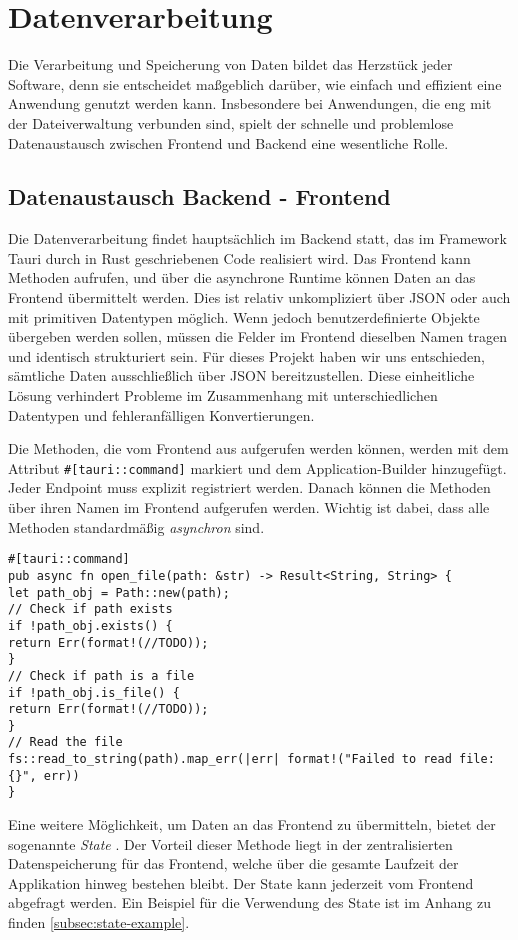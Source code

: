 \section{Datenverarbeitung}

Die Verarbeitung und Speicherung von Daten bildet das Herzstück jeder Software, denn sie entscheidet
maßgeblich darüber, wie einfach und effizient eine Anwendung genutzt werden kann. Insbesondere bei
Anwendungen, die eng mit der Dateiverwaltung verbunden sind, spielt der schnelle und problemlose
Datenaustausch zwischen Frontend und Backend eine wesentliche Rolle.


\subsection{Datenaustausch Backend - Frontend}
Die Datenverarbeitung findet hauptsächlich im Backend statt, das im Framework Tauri \cite{tauri2025} durch in Rust geschriebenen
Code realisiert wird. Das Frontend kann Methoden aufrufen, und über die asynchrone Runtime können Daten an das Frontend
übermittelt werden. Dies ist relativ unkompliziert über JSON oder auch mit primitiven Datentypen möglich. Wenn jedoch
benutzerdefinierte Objekte übergeben werden sollen, müssen die Felder im Frontend dieselben Namen tragen und identisch
strukturiert sein. Für dieses Projekt haben wir uns entschieden, sämtliche Daten ausschließlich über JSON bereitzustellen. Diese
einheitliche Lösung verhindert Probleme im Zusammenhang mit unterschiedlichen Datentypen und fehleranfälligen Konvertierungen.

Die Methoden, die vom Frontend aus aufgerufen werden können, werden mit dem Attribut \verb|#[tauri::command]| markiert und dem
Application-Builder hinzugefügt. Jeder Endpoint muss explizit registriert werden. Danach können die Methoden über ihren Namen im
Frontend aufgerufen werden. Wichtig ist dabei, dass alle Methoden standardmäßig \textit{asynchron} sind.

{\small
\begin{verbatim}
#[tauri::command]
pub async fn open_file(path: &str) -> Result<String, String> {
let path_obj = Path::new(path);
// Check if path exists
if !path_obj.exists() {
return Err(format!(//TODO));
}
// Check if path is a file
if !path_obj.is_file() {
return Err(format!(//TODO));
}
// Read the file
fs::read_to_string(path).map_err(|err| format!("Failed to read file: {}", err))
}
\end{verbatim}
}

Eine weitere Möglichkeit, um Daten an das Frontend zu übermitteln, bietet der sogenannte \textit{State}
\cite{tauri_state_management}. Der Vorteil dieser Methode liegt in der zentralisierten Datenspeicherung für das Frontend, welche
über die gesamte Laufzeit der Applikation hinweg bestehen bleibt. Der State kann jederzeit vom Frontend abgefragt werden. Ein
Beispiel für die Verwendung des State ist im Anhang zu finden \ref{subsec:state-example}.

